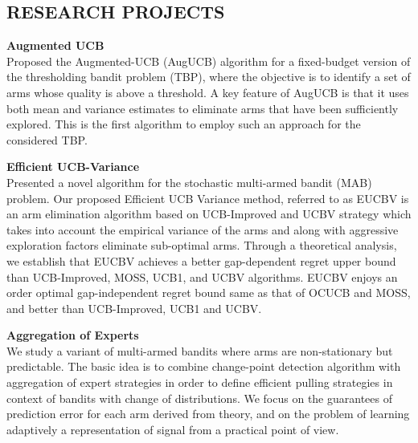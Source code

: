 \documentclass[margin,11pt]{res}
\begin{document}
\begin{resume}
\section{RESEARCH PROJECTS}
\par 

\textbf{Augmented UCB}\\
Proposed the Augmented-UCB (AugUCB) algorithm for a fixed-budget version of the thresholding bandit problem (TBP), where the objective is to identify a set of arms whose quality is above a threshold. A key feature of AugUCB is that it uses both mean and variance estimates to eliminate arms that have been sufficiently explored. This is the first algorithm to employ such an approach for the considered TBP.
\par

\textbf{Efficient UCB-Variance}\\
Presented a novel algorithm for the stochastic multi-armed bandit (MAB) problem. Our proposed Efficient UCB Variance method, referred to as EUCBV is an arm elimination algorithm based on UCB-Improved and UCBV strategy which takes into account the empirical variance of the arms and along with aggressive exploration factors eliminate sub-optimal arms. Through a theoretical analysis, we establish that EUCBV achieves a better gap-dependent regret upper bound than UCB-Improved, MOSS, UCB1, and UCBV algorithms. EUCBV enjoys an order optimal gap-independent regret bound same as that of OCUCB and MOSS, and better than UCB-Improved, UCB1 and UCBV.
\par

\textbf{Aggregation of Experts}\\
We study a variant of multi-armed bandits where arms are non-stationary but predictable. The basic idea is to combine change-point detection algorithm with aggregation of expert strategies in order to define efficient pulling strategies in context of bandits with change of distributions. We focus on the guarantees of prediction error for each arm derived from theory, and on the problem of learning adaptively a representation of signal from a practical point of view. 



\end{resume}
\end{document}
